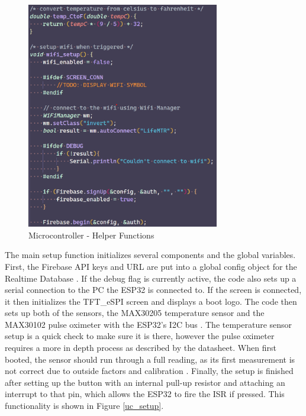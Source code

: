 \documentclass[12pt]{article}
\begin{document}
    \begin{figure}[ht]
        \centering
        \includegraphics[width=0.75\textwidth]{uc_helpers}
        \caption{Microcontroller - Helper Functions}
        \label{uc_help}
    \end{figure} 

    The main setup function initializes several components and the global variables. First, the Firebase API keys and URL are put into a global config object for the Realtime Database \cite{firebase_client_lib}. If the debug flag is currently active, the code also sets up a serial connection to the PC the ESP32 is connected to. If the screen is connected, it then initializes the TFT\_eSPI screen and displays a boot logo. The code then sets up both of the sensors, the MAX30205 temperature sensor and the MAX30102 pulse oximeter with the ESP32's I2C bus \cite{protocentral_max30205,sparkfun_max301x}. The temperature sensor setup is a quick check to make sure it is there, however the pulse oximeter requires a more in depth process as described by the datasheet. When first booted, the sensor should run through a full reading, as its first measurement is not correct due to outside factors and calibration \cite{max30102}. Finally, the setup is finished after setting up the button with an internal pull-up resistor and attaching an interrupt to that pin, which allows the ESP32 to fire the ISR if pressed. This functionality is shown in Figure \ref{uc_setup}.
\end{document}
